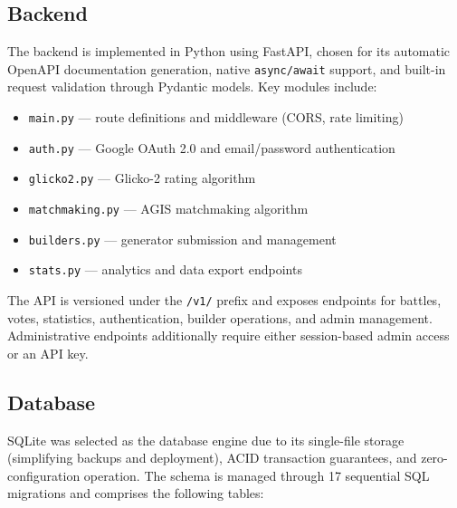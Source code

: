 \documentclass[shortabstract, mgr, english]{iithesis}
\begin{document}
\subsection{Backend}
\label{subsec:sd-backend}

The backend is implemented in Python using FastAPI, chosen for its automatic OpenAPI
documentation generation, native \texttt{async/await} support, and built-in request
validation through Pydantic models. Key modules include:

\begin{itemize}[nosep]
    \item \texttt{main.py} --- route definitions and middleware (CORS, rate limiting)
    \item \texttt{auth.py} --- Google OAuth 2.0 and email/password authentication
    \item \texttt{glicko2.py} --- Glicko-2 rating algorithm
    \item \texttt{matchmaking.py} --- AGIS matchmaking algorithm
    \item \texttt{builders.py} --- generator submission and management
    \item \texttt{stats.py} --- analytics and data export endpoints
\end{itemize}

The API is versioned under the \texttt{/v1/} prefix and exposes endpoints for battles,
votes, statistics, authentication, builder operations, and admin management. Administrative
endpoints additionally require either session-based admin access or an API key.

\subsection{Database}
\label{subsec:sd-database}

SQLite was selected as the database engine due to its single-file storage (simplifying
backups and deployment), ACID transaction guarantees, and zero-configuration operation.
The schema is managed through 17 sequential SQL migrations and comprises the following
tables:
\end{document}
